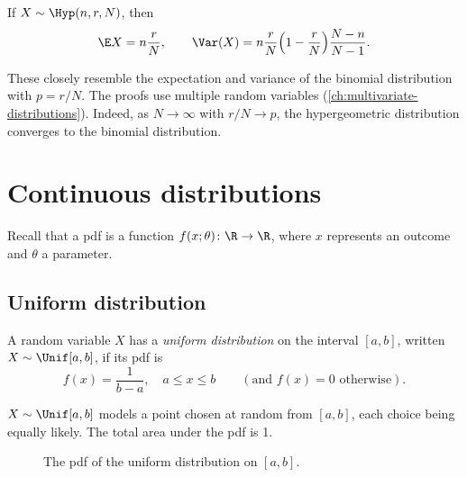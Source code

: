 \begin{theorem}\label{thm:hypergeometric-properties}
If $X \sim \Hyp(n, r, N)$, then
\[
  \E X = n \frac{r}{N}, \qquad \Var(X) = n \frac{r}{N} \Bigl(1 - \frac{r}{N}\Bigr) \frac{N - n}{N - 1}.
\]
\end{theorem}

These closely resemble the expectation and variance of the binomial distribution with $p = r/N$. The proofs use multiple random variables (\cref{ch:multivariate-distributions}). Indeed, as $N \to \infty$ with $r/N \to p$, the hypergeometric distribution converges to the binomial distribution.

\section{Continuous distributions}\label{sec:continuous-families}

Recall that a pdf is a function $f(x; \theta) \colon \R \to \R$, where $x$ represents an outcome and $\theta$ a parameter.

\subsection{Uniform distribution}\label{sec:uniform}

\begin{definition}\label{def:uniform}
A random variable $X$ has a \emph{uniform distribution} on the interval $[a, b]$, written $X \sim \Unif[a, b]$, if its pdf is
\[
  f(x) = \frac{1}{b - a}, \quad a \le x \le b \qquad (\text{and } f(x) = 0 \text{ otherwise}).
\]
\end{definition}

$X \sim \Unif[a, b]$ models a point chosen at random from $[a, b]$, each choice being equally likely. The total area under the pdf is 1.

\begin{figure}[ht]
\centering
{}
\caption{The pdf of the uniform distribution on $[a, b]$.}
\label{fig:uniform-pdf}
\end{figure}


